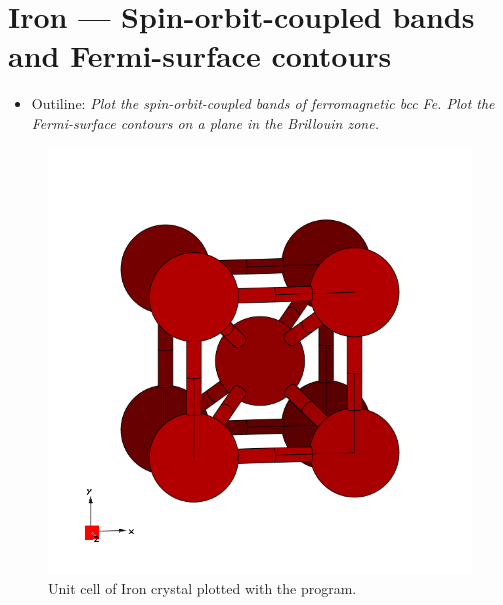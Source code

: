 \section{Iron --- Spin-orbit-coupled bands and Fermi-surface contours}
\label{sec17:IronSO}

\begin{itemize}
	\item Outiline: {\it Plot the spin-orbit-coupled bands of ferromagnetic bcc Fe. Plot the Fermi-surface contours on a plane in the Brillouin zone.}
\end{itemize}

\begin{figure}[h!]
\centering
\includegraphics[width=0.25\columnwidth,trim={45pt 45pt 55pt 55pt},clip]{figure/example08/iron.png}
\caption{Unit cell of Iron crystal plotted with the \xcrysden{} program.}
\label{fig17.0}
\end{figure}


